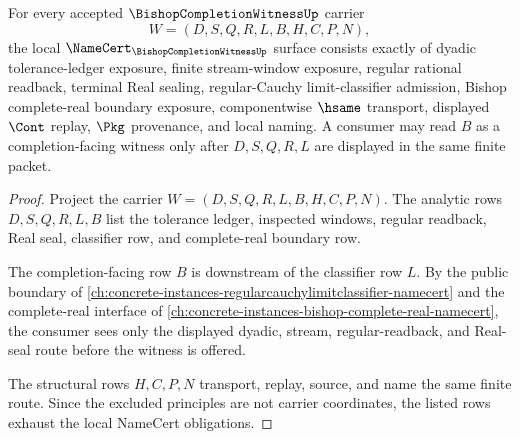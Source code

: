 \begin{theorem}
\label{thm:bishop-completion-witness-namecert-obligations}
For every accepted $\BishopCompletionWitnessUp$ carrier
$$
W=(D,S,Q,R,L,B,H,C,P,N),
$$
the local $\NameCert_{\BishopCompletionWitnessUp}$ surface consists exactly of dyadic tolerance-ledger exposure, finite stream-window exposure, regular rational readback, terminal Real sealing, regular-Cauchy limit-classifier admission, Bishop complete-real boundary exposure, componentwise $\hsame$ transport, displayed $\Cont$ replay, $\Pkg$ provenance, and local naming. A consumer may read $B$ as a completion-facing witness only after $D,S,Q,R,L$ are displayed in the same finite packet.
\end{theorem}
\begin{proof}
Project the carrier $W=(D,S,Q,R,L,B,H,C,P,N)$. The analytic rows $D,S,Q,R,L,B$ list the tolerance ledger, inspected windows, regular readback, Real seal, classifier row, and complete-real boundary row.

The completion-facing row $B$ is downstream of the classifier row $L$. By the public boundary of \autoref{ch:concrete-instances-regularcauchylimitclassifier-namecert} and the complete-real interface of \autoref{ch:concrete-instances-bishop-complete-real-namecert}, the consumer sees only the displayed dyadic, stream, regular-readback, and Real-seal route before the witness is offered.

The structural rows $H,C,P,N$ transport, replay, source, and name the same finite route. Since the excluded principles are not carrier coordinates, the listed rows exhaust the local NameCert obligations.
\end{proof}


